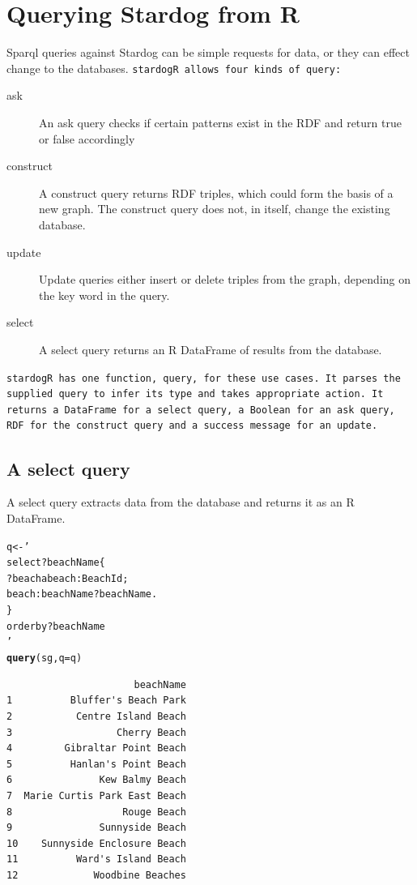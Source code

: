 \documentclass{article}\usepackage[]{graphicx}\usepackage[]{xcolor}
\makeatletter
\newcommand{\hlstr}[1]{\textcolor[rgb]{0.192,0.494,0.8}{#1}}%
\newcommand{\hlstd}[1]{\textcolor[rgb]{0.345,0.345,0.345}{#1}}%
\newcommand{\hlkwb}[1]{\textcolor[rgb]{0.69,0.353,0.396}{#1}}%
\newcommand{\hlkwc}[1]{\textcolor[rgb]{0.333,0.667,0.333}{#1}}%
\newcommand{\hlkwd}[1]{\textcolor[rgb]{0.737,0.353,0.396}{\textbf{#1}}}%
\newenvironment{kframe}{%
 \def\at@end@of@kframe{}%
 \ifinner\ifhmode%
  \def\at@end@of@kframe{\end{minipage}}%
  \begin{minipage}{\columnwidth}%
 \fi\fi%
 \def\FrameCommand##1{\hskip\@totalleftmargin \hskip-\fboxsep
 \colorbox{shadecolor}{##1}\hskip-\fboxsep
     \hskip-\linewidth \hskip-\@totalleftmargin \hskip\columnwidth}%
 \MakeFramed {\advance\hsize-\width
   \@totalleftmargin\z@ \linewidth\hsize
   \@setminipage}}%
 {\par\unskip\endMakeFramed%
 \at@end@of@kframe}
\newenvironment{knitrout}{}{} %
\makeatother
\begin{document}
\section{Querying Stardog from R}

Sparql queries against Stardog can be simple requests for data, or they can effect change to the databases. \tt{stardogR} allows four kinds of query:

\begin{description}
  \item[ask] An ask query checks if certain patterns exist in the RDF and return true or false accordingly
  \item[construct] A construct query returns RDF triples, which could form the basis of a new graph. The construct query does not, in itself, change the existing database.
  \item[update] Update queries either insert or delete triples from the graph, depending on the key word in the query.
  \item[select] A select query returns an R DataFrame of results from the database.
\end{description}

\tt{stardogR} has one function, \tt{query}, for these use cases. It parses the supplied query to infer its type and takes appropriate action. It returns a DataFrame for a select query, a Boolean for an ask query, RDF for the construct query and a success message for an update.

\subsection{A select query}

A select query extracts data from the database and returns it as an R DataFrame.

\begin{knitrout}
\color{fgcolor}\begin{kframe}
\begin{alltt}
\hlstd{q} \hlkwb{<-} \hlstr{'
select ?beachName \{
  ?beach a beach:BeachId ;
    beach:beachName ?beachName .
\}
order by ?beachName
'}
\hlkwd{query}\hlstd{(sg,} \hlkwc{q} \hlstd{= q)}
\end{alltt}
\end{kframe}
\end{knitrout}

\begin{verbatim}
                      beachName
1          Bluffer's Beach Park
2           Centre Island Beach
3                  Cherry Beach
4         Gibraltar Point Beach
5          Hanlan's Point Beach
6               Kew Balmy Beach
7  Marie Curtis Park East Beach
8                   Rouge Beach
9               Sunnyside Beach
10    Sunnyside Enclosure Beach
11          Ward's Island Beach
12             Woodbine Beaches
\end{verbatim}
\end{document}
